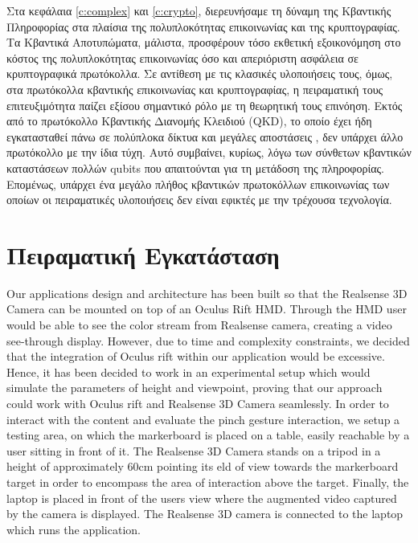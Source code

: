 

 \label{c:exper}
Στα κεφάλαια \ref{c:complex} και \ref{c:crypto}, διερευνήσαμε τη δύναμη της Κβαντικής Πληροφορίας στα πλαίσια της πολυπλοκότητας επικοινωνίας και της κρυπτογραφίας. Τα Κβαντικά Αποτυπώματα, μάλιστα, προσφέρουν τόσο εκθετική εξοικονόμηση στο κόστος της πολυπλοκότητας επικοινωνίας όσο και απεριόριστη ασφάλεια σε κρυπτογραφικά πρωτόκολλα. Σε αντίθεση με τις κλασικές υλοποιήσεις τους, όμως, στα πρωτόκολλα κβαντικής επικοινωνίας και κρυπτογραφίας, η πειραματική τους επιτευξιμότητα παίζει εξίσου σημαντικό ρόλο με τη θεωρητική τους επινόηση. Εκτός από το πρωτόκολλο Κβαντικής Διανομής Κλειδιού (QKD), το οποίο έχει ήδη εγκατασταθεί πάνω σε πολύπλοκα δίκτυα και μεγάλες αποστάσεις \cite{QKDexp1,QKDexp2}, δεν υπάρχει άλλο πρωτόκολλο με την ίδια τύχη. Αυτό συμβαίνει, κυρίως, λόγω των σύνθετων κβαντικών καταστάσεων πολλών qubits που απαιτούνται για τη μετάδοση της πληροφορίας. Επομένως, υπάρχει ένα μεγάλο πλήθος κβαντικών πρωτοκόλλων επικοινωνίας των οποίων οι πειραματικές υλοποιήσεις δεν είναι εφικτές με την τρέχουσα τεχνολογία.




\section{Πειραματική Εγκατάσταση}

Our applications design and architecture has been built so that the Realsense 3D Camera can be mounted on top of an Oculus Rift HMD. Through the HMD user would be able to see the color stream from Realsense camera, creating a video see-through display. However, due to time and complexity constraints, we decided that the integration of Oculus rift within our application would be excessive. Hence, it has been decided to work in an experimental setup which would simulate the parameters of height and viewpoint, proving that our approach could work with Oculus rift and Realsense 3D Camera seamlessly. In order to interact with the content and evaluate the pinch gesture interaction, we setup a testing area, on which the markerboard is placed on a table, easily reachable by a user sitting in front of it. The Realsense 3D Camera stands on a tripod in a height of approximately 60cm pointing its eld of view towards the markerboard target in order to encompass the area of interaction above the target. Finally, the laptop is placed in front of the users view where the augmented video captured by the camera is displayed. The Realsense 3D camera is connected to the laptop which runs the application.



